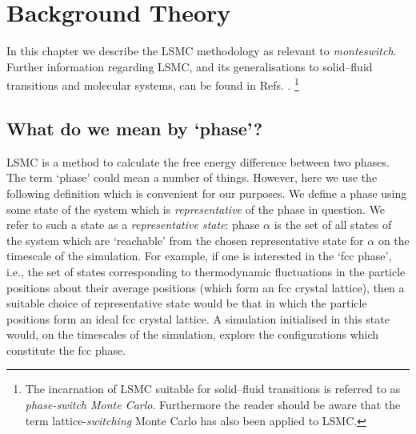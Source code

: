 \documentclass{report}
\begin{document}
\chapter{Background Theory}\label{chapter:background}
In this chapter we describe the LSMC methodology as relevant to \emph{monteswitch}. Further information regarding LSMC,
and its generalisations to solid--fluid transitions and molecular systems, can be found in Refs.  
\cite{Bruce_1997,Bruce_2000,Wilding_2000,Jackson_2002,Errington_2004,McNeil-Watson_2006,Jackson_2007,Bridgwater_2014}.
\footnote{The incarnation of LSMC suitable for solid--fluid transitions is referred to as \emph{phase-switch Monte Carlo}. Furthermore
the reader should be aware that the term lattice-\emph{switching} Monte Carlo has also been applied to LSMC.}


\section{What do we mean by `phase'?}\label{sec:phase}
LSMC is a method to calculate the free energy difference between two phases. The term `phase' could mean a number of things. However, here
we use the following definition which is convenient for our purposes. We define a phase using some state of the system
which is \emph{representative} of the phase in question. We refer to such a state as a \emph{representative state}: phase $\alpha$ is the 
set of all states of the system which are `reachable' from the chosen representative state for $\alpha$ on the timescale of the simulation. 
For example, if one is interested in the `fcc phase', i.e., the set of states 
corresponding to thermodynamic fluctuations in the particle positions about their average positions (which form an fcc crystal
lattice), then a suitable choice of representative state would be that in which the particle positions form an ideal fcc crystal lattice. A
simulation initialised in this state would, on the timescales of the simulation, explore the configurations which
constitute the fcc phase.
\end{document}

